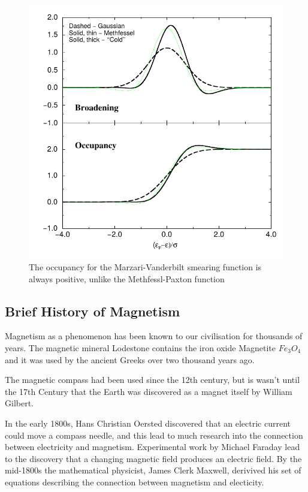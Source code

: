 \begin{figure}
\centering
\begin{minipage}{.65\textwidth}
\centering
    \includegraphics[width=.6\linewidth]{chapters/interatomic_potential_fitting/images/marzarismearing.png}
    \caption{The occupancy for the Marzari-Vanderbilt smearing function is always positive, unlike the Methfessl-Paxton function\cite{marzarithesis2}}
    \label{fig:marzarimethfessel}
\end{minipage}
\end{figure}






\subsection{Brief History of Magnetism}

Magnetism as a phenomenon has been known to our civilisation for thousands of years.  The magnetic mineral Lodestone contains the iron oxide Magnetite $Fe_3 O_4$ and it was used by the ancient Greeks over two thousand years ago.

The magnetic compass had been used since the 12th century, but is wasn't until the 17th Century that the Earth was discovered as a magnet itself by William Gilbert.

In the early 1800s, Hans Christian Oersted discovered that an electric current could move a compass needle, and this lead to much research into the connection between electricity and magnetism.  Experimental work by Michael Faraday lead to the discovery that a changing magnetic field produces an electric field.  By the mid-1800s the mathematical physicist, James Clerk Maxwell, derivived his set of equations describing the connection between magnetism and electicity. 

